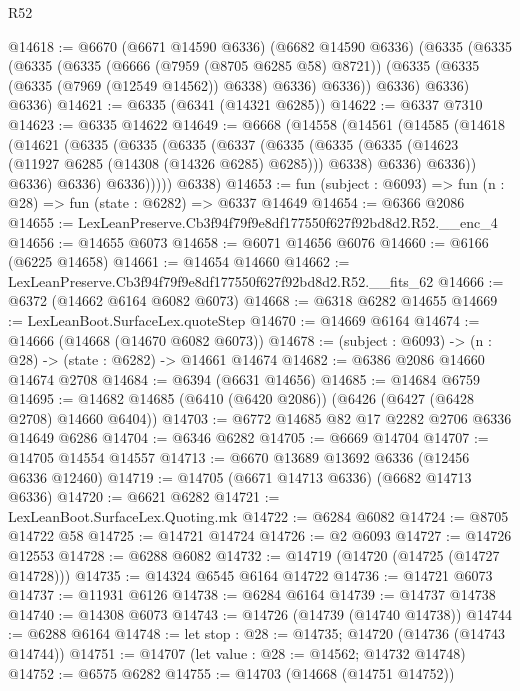 \begin{lexlean}{R52}
\begin{coremodule}
@14618 := @6670
    (@6671 @14590 @6336)
    (@6682 @14590 @6336)
    (@6335
      (@6335
        (@6335
          (@6335
            (@6666 (@7959 (@8705 @6285 @58) @8721))
            (@6335 (@6335 (@6335 (@7969 (@12549 @14562)) @6338) @6336) @6336))
          @6336)
        @6336)
      @6336)
@14621 := @6335 (@6341 (@14321 @6285))
@14622 := @6337 @7310
@14623 := @6335 @14622
@14649 := @6668
    (@14558
      (@14561
        (@14585
          (@14618
            (@14621
              (@6335
                (@6335
                  (@6335
                    (@6337
                      (@6335
                        (@6335
                          (@6335 (@14623 (@11927 @6285 (@14308 (@14326 @6285) @6285))) @6338)
                          @6336)
                        @6336))
                    @6336)
                  @6336)
                @6336)))))
      @6338)
@14653 := fun (subject : @6093) => fun (n : @28) => fun (state : @6282) => @6337 @14649
@14654 := @6366 @2086
@14655 := LexLeanPreserve.Cb3f94f79f9e8df177550f627f92bd8d2.R52.__enc_4
@14656 := @14655 @6073
@14658 := @6071 @14656 @6076
@14660 := @6166 (@6225 @14658)
@14661 := @14654 @14660
@14662 := LexLeanPreserve.Cb3f94f79f9e8df177550f627f92bd8d2.R52.__fits_62
@14666 := @6372 (@14662 @6164 @6082 @6073)
@14668 := @6318 @6282 @14655
@14669 := LexLeanBoot.SurfaceLex.quoteStep
@14670 := @14669 @6164
@14674 := @14666 (@14668 (@14670 @6082 @6073))
@14678 := (subject : @6093) -> (n : @28) -> (state : @6282) -> @14661 @14674
@14682 := @6386 @2086 @14660 @14674 @2708
@14684 := @6394 (@6631 @14656)
@14685 := @14684 @6759
@14695 := @14682 @14685 (@6410 (@6420 @2086)) (@6426 (@6427 (@6428 @2708) @14660 @6404))
@14703 := @6772 @14685 @82 @17 @2282 @2706 @6336 @14649 @6286
@14704 := @6346 @6282
@14705 := @6669 @14704
@14707 := @14705 @14554 @14557
@14713 := @6670 @13689 @13692 @6336 (@12456 @6336 @12460)
@14719 := @14705 (@6671 @14713 @6336) (@6682 @14713 @6336)
@14720 := @6621 @6282
@14721 := LexLeanBoot.SurfaceLex.Quoting.mk
@14722 := @6284 @6082
@14724 := @8705 @14722 @58
@14725 := @14721 @14724
@14726 := @2 @6093
@14727 := @14726 @12553
@14728 := @6288 @6082
@14732 := @14719 (@14720 (@14725 (@14727 @14728)))
@14735 := @14324 @6545 @6164 @14722
@14736 := @14721 @6073
@14737 := @11931 @6126
@14738 := @6284 @6164
@14739 := @14737 @14738
@14740 := @14308 @6073
@14743 := @14726 (@14739 (@14740 @14738))
@14744 := @6288 @6164
@14748 := let stop : @28 := @14735; @14720 (@14736 (@14743 @14744))
@14751 := @14707 (let value : @28 := @14562; @14732 @14748)
@14752 := @6575 @6282
@14755 := @14703 (@14668 (@14751 @14752))

\end{coremodule}
\end{lexlean}
